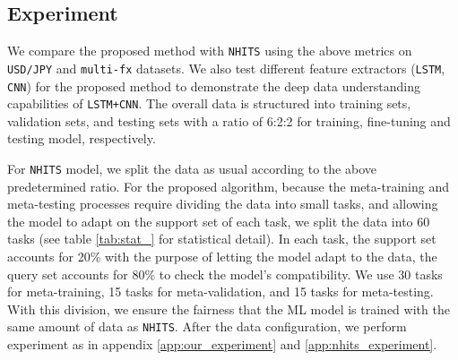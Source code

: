 \documentclass[aps,prb,groupedaddress,twocolumn,showpacs,dvipdfmx,superscriptaddress,pdftex]{revtex4-2}
\begin{document}
\vspace{2mm}
\subsection{Experiment}


We compare the proposed method with \verb|NHITS| using the above metrics on \verb|USD/JPY| and \verb|multi-fx| datasets. We also test different feature extractors (\verb|LSTM|, \verb|CNN|) for the proposed method to demonstrate the deep data understanding capabilities of \verb|LSTM+CNN|. The overall data is structured into training sets, validation sets, and testing sets with a ratio of 6:2:2 for training, fine-tuning and testing model, respectively.

\vspace{2mm}

For \verb|NHITS| model, we split the data as usual according to the above predetermined ratio. For the proposed algorithm, because the meta-training and meta-testing processes require dividing the data into small tasks, and allowing the model to adapt on the support set of each task, we split the data into 60 tasks (see table \ref{tab:stat_} for statistical detail). In each task, the support set accounts for 20\% with the purpose of letting the model adapt to the data, the query set accounts for 80\% to check the model's compatibility. We use 30 tasks for meta-training, 15 tasks for meta-validation, and 15 tasks for meta-testing. With this division, we ensure the fairness that the ML model is trained with the same amount of data as \verb|NHITS|. After the data configuration, we perform experiment as in appendix \ref{app:our_experiment} and \ref{app:nhits_experiment}.
\end{document}
